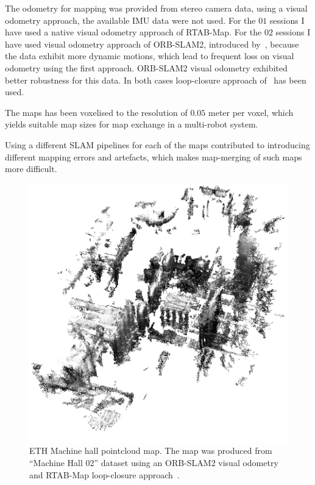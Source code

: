 The odometry for mapping was provided from stereo camera data, using a visual odometry approach, the available \gls{IMU} data were not used. For the $01$ sessions I have used a native visual odometry approach of RTAB-Map. For the $02$ sessions I have used visual odometry approach of {ORB-SLAM2}, introduced by~\citet{mur2017orb}, because the data exhibit more dynamic motions, which lead to frequent loss on visual odometry using the first approach. {ORB-SLAM2} visual odometry exhibited better robustness for this data. In both cases loop-closure approach of~\citet{labbe2014online} has been used.

The maps has been voxelised to the resolution of $0.05$ meter per voxel, which yields suitable map sizes for map exchange in a multi-robot system.

Using a different \gls{SLAM} pipelines for each of the maps contributed to introducing different mapping errors and artefacts, which makes map-merging of such maps more difficult.

\begin{figure}
    \centering
    \includegraphics[width=\textwidth]{../img/euroc_mh_02.png}
    \caption[Machine hall pointcloud map]{ETH Machine hall pointcloud map. The map was produced from ``Machine Hall 02'' dataset using an {ORB-SLAM2} visual odometry~\citep{mur2017orb} and RTAB-Map loop-closure approach~\citep{labbe2014online}.}
    \label{fig:euroc_mh_02}
\end{figure}

